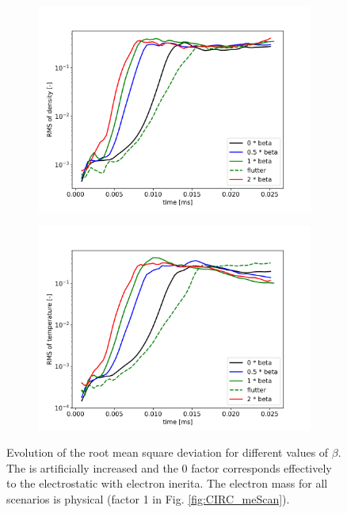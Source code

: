 \begin{figure}[H]\centering
	\begin{subfigure}[t]{0.45\textwidth}
		\centering
		\includegraphics[width=1\textwidth]{schemes/RMSn_betaScan.jpg}
	\end{subfigure}
	\begin{subfigure}[t]{0.45\textwidth}
		\centering
		\includegraphics[width=1\textwidth]{schemes/RMST_betaScan.jpg}
	\end{subfigure}
	\caption{Evolution of the root mean square deviation for different values of $\beta$. The  is artificially increased and the 0 factor corresponds effectively to the electrostatic with electron inerita. The electron mass for all scenarios is physical (factor 1 in Fig. \ref{fig:CIRC_meScan}).}
	\label{fig:CIRC_betaScan}
\end{figure}

